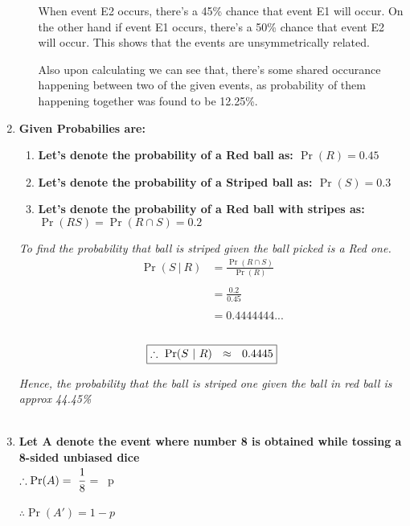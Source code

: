\documentclass{article}
\begin{document}
\begin{enumerate}
\begin{enumerate}
    \textnormal{When event E2 occurs, there's a 45\% chance that event E1 will occur. On the other hand if event E1 occurs, there's a 50\% chance that event E2 will occur.}
    \textnormal{This shows that the events are unsymmetrically related.}
    
    \textnormal{Also upon calculating we can see that, there's some shared occurance happening between two of the given events,}
    \textnormal{as probability of them happening together was found to be 12.25\%.}
  \end{enumerate}

\newpage
\item\textbf{Given Probabilies are:}\\
  \begin{enumerate}
    \item\textbf{Let's denote the probability of a Red ball as:  $\Pr(R) = 0.45$}
    \item\textbf{Let's denote the probability of a Striped ball as:  $\Pr(S) = 0.3$}
    \item\textbf{Let's denote the probability of a Red ball with stripes as:  $\Pr(RS) = \Pr(R \cap S) = 0.2$}\\
  \end{enumerate}
  \textit{To find the probability that ball is striped given the ball picked is a Red one.}\\
  \begin{align*}
    \Pr(S \ |\ R) & = \frac{\Pr(R \cap S)}{\Pr(R)}\\\\
    & = \frac{0.2}{0.45}\\\\
    & = 0.4444444...
  \end{align*}\\
  \[
     \boxed{\therefore\ \Pr(S \ |\ R )\ \ \approx \ \ 0.4445}\\
  \]

  \textit{Hence, the probability that the ball is striped one given the ball in red ball is approx 44.45\%}\\\\

\newpage  
\item \textbf{Let A denote the event where number 8 is obtained while tossing a 8-sided unbiased dice}\\
$\therefore \Pr(A) = \ \cfrac{1}{8}$ = \ p\\\\
$\therefore \Pr(A') = 1 - p $  


\end{enumerate}
\end{document}
